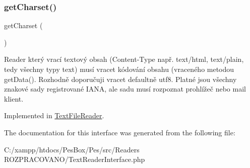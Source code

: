 \subsubsection{\texorpdfstring{get\+Charset()}{getCharset()}}
{\footnotesize\ttfamily get\+Charset (\begin{DoxyParamCaption}{ }\end{DoxyParamCaption})}

Reader který vrací textový obsah (Content-\/\+Type např. text/html, text/plain, tedy všechny typy text) musí vracet kódování obsahu (vraceného metodou get\+Data(). Rozhodně doporučuji vracet defaultně \textquotesingle{}utf8\textquotesingle{}. Platné jsou všechny znakové sady registrované I\+A\+NA, ale sadu musí rozpoznat prohlížeč nebo mail klient. 

Implemented in \mbox{\hyperlink{class_pes_1_1_readers_1_1_text_file_reader_abca2d528da8311b6fcfe040768cbaa24}{Text\+File\+Reader}}.



The documentation for this interface was generated from the following file\+:\begin{DoxyCompactItemize}
\item 
C\+:/xampp/htdocs/\+Pes\+Box/\+Pes/src/\+Readers R\+O\+Z\+P\+R\+A\+C\+O\+V\+A\+N\+O/Text\+Reader\+Interface.\+php\end{DoxyCompactItemize}
